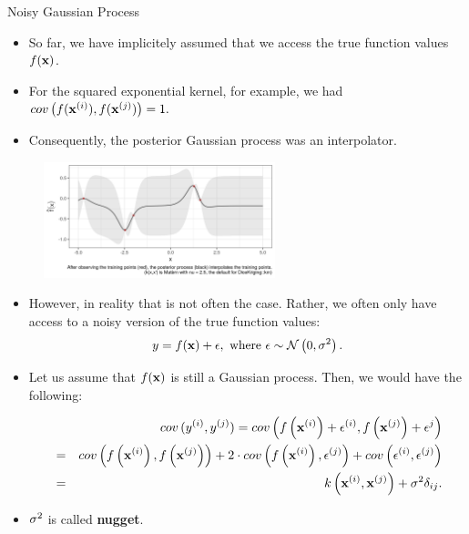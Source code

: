 \begin{frame}[c,allowframebreaks]{Noisy Gaussian Process}

\begin{itemize}
\item So far, we have implicitely assumed that we access the true function values $f(\mathbf{x})$.
\vspace{3mm}
\item For the squared exponential kernel, for example, we had
  $cov\left(f(\mathbf{x}^{(i)}), f(\mathbf{x}^{(j)})\right) = 1.$
\vspace{3mm}
\item Consequently, the posterior Gaussian process was an interpolator.
\end{itemize}

\begin{figure}
\includegraphics[width=0.6\textwidth]{figure_man/gp-interpolator.png}\par
\end{figure}

\framebreak

\begin{itemize}

\item However, in reality that is not often the case. Rather, we often only have access to a noisy version of the true function values:
  $$y = f(\mathbf{x}) + \epsilon, \text{ where } \epsilon \sim\mathcal{N}\left(0, \sigma^2\right).$$
  
\item Let us assume that $f(\mathbf{x})$ is still a Gaussian process. Then, we would have the following:
  \begin{footnotesize} 
  \begin{eqnarray*}
    &&cov\,(y^{(i)}, y^{(j)}) = cov\left(f\left(\mathbf{x}^{(i)}\right) + \epsilon^{(i)}, f\left(\mathbf{x}^{(j)}\right) + \epsilon^{j}\right) \\
    &=& cov\left(f\left(\mathbf{x}^{(i)}\right), f\left(\mathbf{x}^{(j)}\right)\right) + 2 \cdot cov\left(f\left(\mathbf{x}^{(i)}\right), \epsilon^{(j)}\right) + cov\left(\epsilon^{(i)}, \epsilon^{(j)}\right) 
    \\ &=& k\left(\mathbf{x}^{(i)}, \mathbf{x}^{(j)}\right) + \sigma^2 \delta_{ij}. 
  \end{eqnarray*}
  \end{footnotesize}
  \item $\sigma^2$ is called \textbf{nugget}. 
\end{itemize}


\end{frame}
